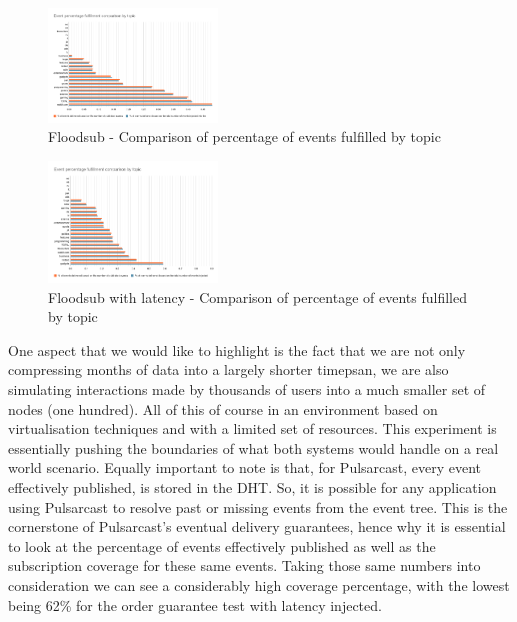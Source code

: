 \begin{figure}[!htb]
  \centering
  \includegraphics[width=0.4\textwidth]{img/graph-floodsub-event-percentage-fulfillment-comparison.png}
  \caption{Floodsub - Comparison of percentage of events fulfilled by topic}
  \label{fig:graph-floodsub-event-percentage-fulfillment-comparison}
\end{figure}

\begin{figure}[!htb]
  \centering
  \includegraphics[width=0.4\textwidth]{img/graph-floodsub-latency-event-percentage-fulfillment-comparison.png}
  \caption{Floodsub with latency - Comparison of percentage of events fulfilled by topic}
  \label{fig:graph-floodsub-latency-event-percentage-fulfillment-comparison}
\end{figure}

One aspect that we would like to highlight is the fact that we are not only
compressing months of data into a largely shorter timepsan, we are also
simulating interactions made by thousands of users into a much smaller set of
nodes (one hundred). All of this of course in an environment based on
virtualisation techniques and with a limited set of resources. This experiment
is essentially pushing the boundaries of what both systems would handle on a
real world scenario. Equally important to note is that, for Pulsarcast, every
event effectively published, is stored in the DHT. So, it is possible for any
application using Pulsarcast to resolve past or missing events from the event
tree. This is the cornerstone of Pulsarcast's eventual delivery guarantees,
hence why it is essential to look at the percentage of events effectively
published as well as the subscription coverage for these same events. Taking
those same numbers into consideration we can see a considerably high coverage
percentage, with the lowest being 62\% for the order guarantee test with
latency injected.
